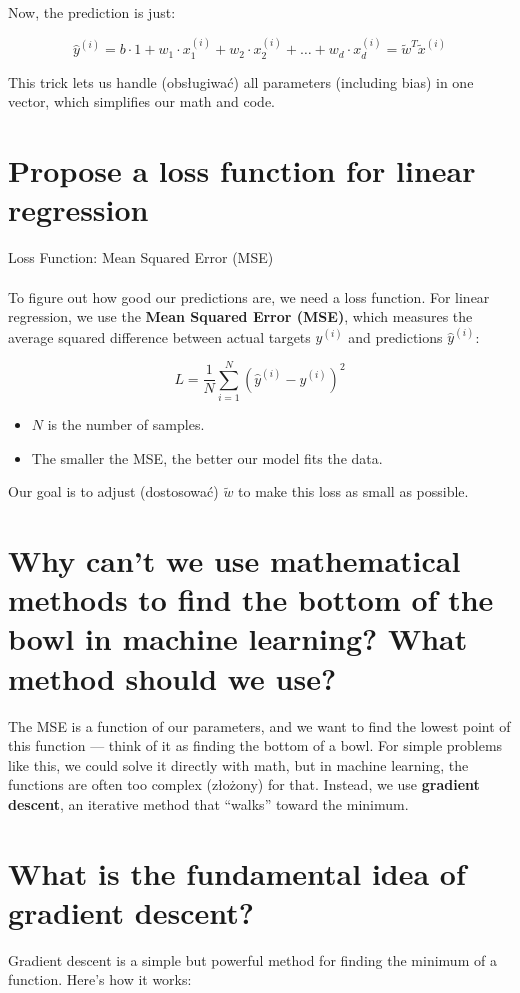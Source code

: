 \documentclass{article}
\begin{document}
Now, the prediction is just:

\[
\hat{y}^{(i)} = b \cdot 1 + w_1 \cdot x_1^{(i)} + w_2 \cdot x_2^{(i)} + \dots + w_d \cdot x_d^{(i)} = \tilde{w}^{T} \tilde{x}^{(i)}
\]

This trick lets us handle (obsługiwać) all parameters (including bias) in one vector, which simplifies our math and code.
\newpage
\section{Propose a loss function for linear regression}
Loss Function: Mean Squared Error (MSE)\\
\\
To figure out how good our predictions are, we need a loss function. For linear regression, we use the \textbf{Mean Squared Error (MSE)}, which measures the average squared difference between actual targets \( y^{(i)} \) and predictions \( \hat{y}^{(i)} \):

\[
L = \frac{1}{N} \sum_{i=1}^{N} \left( \hat{y}^{(i)} - y^{(i)} \right)^2
\]

\begin{itemize}
    \item \( N \) is the number of samples.
    \item The smaller the MSE, the better our model fits the data.
\end{itemize}

Our goal is to adjust (dostosować) \( \tilde{w} \) to make this loss as small as possible.

\section{Why can't we use mathematical methods to find the bottom of the bowl in machine learning? What method should we use?}
The MSE is a function of our parameters, and we want to find the lowest point of this function --- think of it as finding the bottom of a bowl. For simple problems like this, we could solve it directly with math, but in machine learning, the functions are often too complex (złożony) for that. Instead, we use \textbf{gradient descent}, an iterative method that ``walks'' toward the minimum.

\section{ What is the fundamental idea of gradient descent?}

Gradient descent is a simple but powerful method for finding the minimum of a function. Here's how it works:
\end{document}
